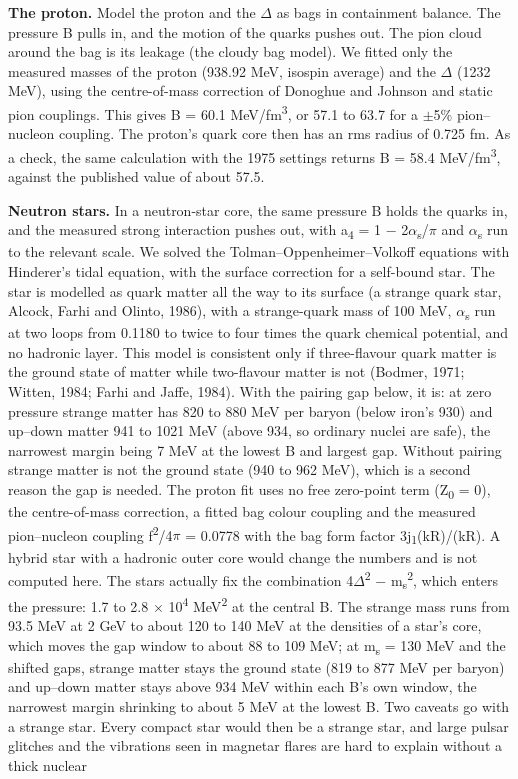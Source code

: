 \documentclass[
  11pt,
]{article}
\begin{document}
\textbf{The proton.} Model the proton and the \ensuremath{\Delta} as bags in containment balance. The pressure B pulls in, and the motion of the quarks pushes out. The pion cloud around the bag is its leakage (the cloudy bag model). We fitted only the measured masses of the proton (938.92 MeV, isospin average) and the \ensuremath{\Delta} (1232 MeV), using the centre-of-mass correction of Donoghue and Johnson and static pion couplings. This gives B = 60.1 MeV/fm\textsuperscript{3}, or 57.1 to 63.7 for a \ensuremath{\pm}5\% pion--nucleon coupling. The proton's quark core then has an rms radius of 0.725 fm. As a check, the same calculation with the 1975 settings returns B = 58.4 MeV/fm\textsuperscript{3}, against the published value of about 57.5.

\textbf{Neutron stars.} In a neutron-star core, the same pressure B holds the quarks in, and the measured strong interaction pushes out, with a\textsubscript{4} = 1 \ensuremath{-} 2\ensuremath{\alpha}\textsubscript{s}/\ensuremath{\pi} and \ensuremath{\alpha}\textsubscript{s} run to the relevant scale. We solved the Tolman--Oppenheimer--Volkoff equations with Hinderer's tidal equation, with the surface correction for a self-bound star. The star is modelled as quark matter all the way to its surface (a strange quark star, Alcock, Farhi and Olinto, 1986), with a strange-quark mass of 100 MeV, \ensuremath{\alpha}\textsubscript{s} run at two loops from 0.1180 to twice to four times the quark chemical potential, and no hadronic layer. This model is consistent only if three-flavour quark matter is the ground state of matter while two-flavour matter is not (Bodmer, 1971; Witten, 1984; Farhi and Jaffe, 1984). With the pairing gap below, it is: at zero pressure strange matter has 820 to 880 MeV per baryon (below iron's 930) and up--down matter 941 to 1021 MeV (above 934, so ordinary nuclei are safe), the narrowest margin being 7 MeV at the lowest B and largest gap. Without pairing strange matter is not the ground state (940 to 962 MeV), which is a second reason the gap is needed. The proton fit uses no free zero-point term (Z\textsubscript{0} = 0), the centre-of-mass correction, a fitted bag colour coupling and the measured pion--nucleon coupling f\textsuperscript{2}/4\ensuremath{\pi} = 0.0778 with the bag form factor 3j\textsubscript{1}(kR)/(kR). A hybrid star with a hadronic outer core would change the numbers and is not computed here. The stars actually fix the combination 4\ensuremath{\Delta}\textsuperscript{2} \ensuremath{-} m\textsubscript{s}\textsuperscript{2}, which enters the pressure: 1.7 to 2.8 \ensuremath{\times} 10\textsuperscript{4} MeV\textsuperscript{2} at the central B. The strange mass runs from 93.5 MeV at 2 GeV to about 120 to 140 MeV at the densities of a star's core, which moves the gap window to about 88 to 109 MeV; at m\textsubscript{s} = 130 MeV and the shifted gaps, strange matter stays the ground state (819 to 877 MeV per baryon) and up--down matter stays above 934 MeV within each B's own window, the narrowest margin shrinking to about 5 MeV at the lowest B. Two caveats go with a strange star. Every compact star would then be a strange star, and large pulsar glitches and the vibrations seen in magnetar flares are hard to explain without a thick nuclear 
\end{document}
